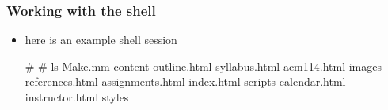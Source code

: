 \begin{frame}[fragile]
%
  \frametitle{Working with the shell}
%
  \begin{itemize}
%
  \item here is an example shell session
    \begin{bash}
#
# ls
Make.mm                 content                 outline.html            syllabus.html
acm114.html             images                  references.html
assignments.html        index.html              scripts
calendar.html           instructor.html         styles
    \end{bash}
%
  \end{itemize}
%
\end{frame}


